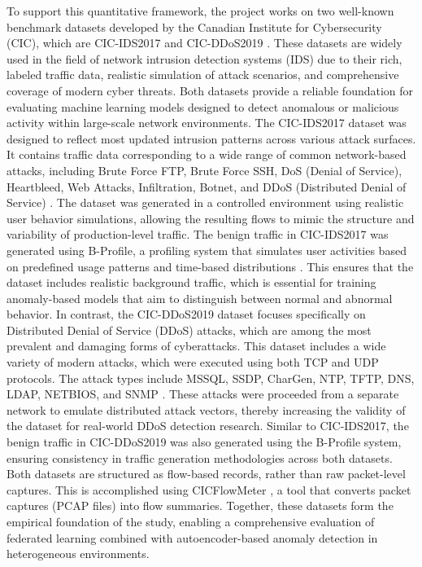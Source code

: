 To support this quantitative framework, the project works on two well-known benchmark datasets developed by the Canadian Institute for Cybersecurity (CIC), which are CIC-IDS2017 \citep{Sharafaldin2018TowardGA,cicids2017} and CIC-DDoS2019 \citep{8888419,cicddos2019}. These datasets are widely used in the field of network intrusion detection systems (IDS) due to their rich, labeled traffic data, realistic simulation of attack scenarios, and comprehensive coverage of modern cyber threats. Both datasets provide a reliable foundation for evaluating machine learning models designed to detect anomalous or malicious activity within large-scale network environments. The CIC-IDS2017 dataset was designed to reflect most updated intrusion patterns across various attack surfaces. It contains traffic data corresponding to a wide range of common network-based attacks, including Brute Force FTP, Brute Force SSH, DoS (Denial of Service), Heartbleed, Web Attacks, Infiltration, Botnet, and DDoS (Distributed Denial of Service) \citep{cicids2017}. The dataset was generated in a controlled environment using realistic user behavior simulations, allowing the resulting flows to mimic the structure and variability of production-level traffic. The benign traffic in CIC-IDS2017 was generated using B-Profile, a profiling system that simulates user activities based on predefined usage patterns and time-based distributions \citep{Sharafaldin2018TowardGA}. This ensures that the dataset includes realistic background traffic, which is essential for training anomaly-based models that aim to distinguish between normal and abnormal behavior. In contrast, the CIC-DDoS2019 dataset focuses specifically on Distributed Denial of Service (DDoS) attacks, which are among the most prevalent and damaging forms of cyberattacks. This dataset includes a wide variety of modern attacks, which were executed using both TCP and UDP protocols. The attack types include MSSQL, SSDP, CharGen, NTP, TFTP, DNS, LDAP, NETBIOS, and SNMP \citep{cicddos2019}. These attacks were proceeded from a separate network to emulate distributed attack vectors, thereby increasing the validity of the dataset for real-world DDoS detection research. Similar to CIC-IDS2017, the benign traffic in CIC-DDoS2019 was also generated using the B-Profile system, ensuring consistency in traffic generation methodologies across both datasets. Both datasets are structured as flow-based records, rather than raw packet-level captures. This is accomplished using CICFlowMeter \citep{cicflowmeter}, a tool that converts packet captures (PCAP files) into flow summaries. Together, these datasets form the empirical foundation of the study, enabling a comprehensive evaluation of federated learning combined with autoencoder-based anomaly detection in heterogeneous environments.

